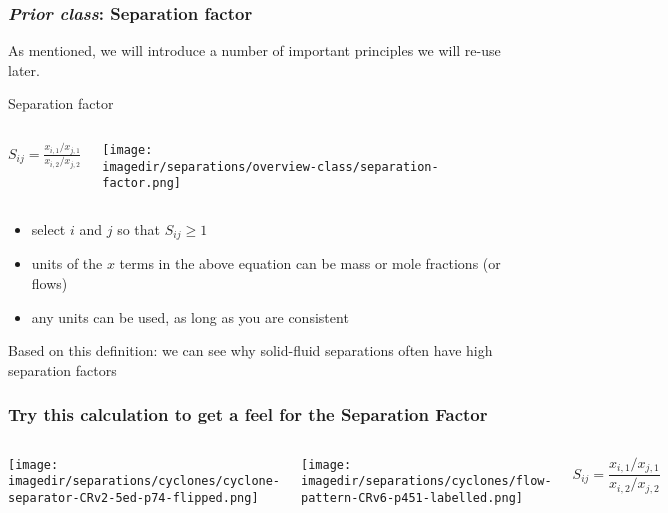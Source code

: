 \begin{frame}\frametitle{\emph{Prior class}: Separation factor}
	As mentioned, we will introduce a number of important principles we will re-use later.

	\begin{exampleblock}{{\color{purple} Separation factor}}
		\begin{columns}[c]
				$S_{ij} = \displaystyle \frac{x_{i,1} / x_{j,1}}{x_{i,2} / x_{j,2}}$
				\begin{center}
					\texttt{[image: \\imagedir/separations/overview-class/separation-factor.png]}
				\end{center}
		\end{columns}
	\end{exampleblock}

	\begin{itemize}
		\item	select $i$ and $j$ so that $S_{ij} \geq 1$
		\item	units of the $x$ terms in the above equation can be mass or mole fractions (or flows)
		\item	any units can be used, as long as you are consistent
	\end{itemize}

	Based on this definition: we can see why solid-fluid separations often have high separation factors
\end{frame}

\begin{frame}\frametitle{Try this calculation to get a feel for the Separation Factor}
	\begin{columns}[b]
			\centerline{\texttt{[image: \\imagedir/separations/cyclones/cyclone-separator-CRv2-5ed-p74-flipped.png]}}
			
			\centerline{\texttt{[image: \\imagedir/separations/cyclones/flow-pattern-CRv6-p451-labelled.png]}}
			\[S_{ij} = \displaystyle \frac{x_{i,1} / x_{j,1}}{x_{i,2} / x_{j,2}}\]
	\end{columns}
\end{frame}


